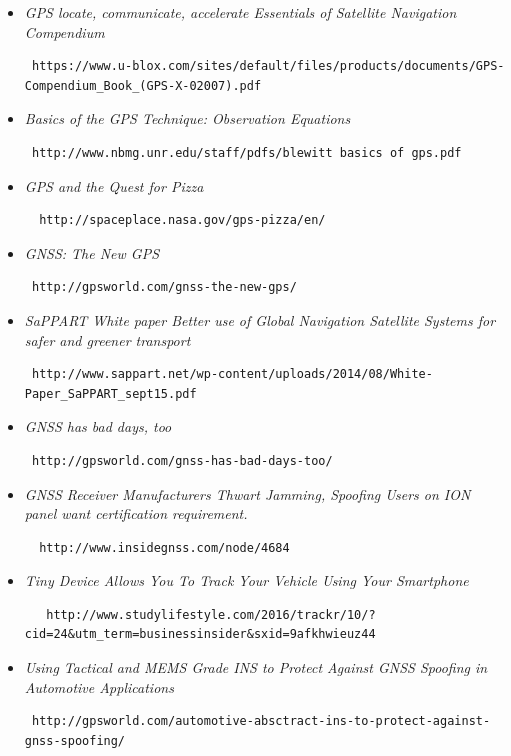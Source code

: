 \begin{itemize}
\item {\textit{GPS locate, communicate, accelerate Essentials of Satellite Navigation Compendium}} {\tiny \begin{verbatim} https://www.u-blox.com/sites/default/files/products/documents/GPS-Compendium_Book_(GPS-X-02007).pdf \end{verbatim}} 
\item {\textit{Basics of the GPS Technique: Observation Equations}} {\tiny \begin{verbatim} http://www.nbmg.unr.edu/staff/pdfs/blewitt basics of gps.pdf\end{verbatim}}  
\item {\textit{GPS and the Quest for Pizza}} {\tiny \begin{verbatim}  http://spaceplace.nasa.gov/gps-pizza/en/\end{verbatim}}
\item {\textit{GNSS: The New GPS}} {\tiny \begin{verbatim} http://gpsworld.com/gnss-the-new-gps/ \end{verbatim}}
\item {\textit{SaPPART White paper Better use of Global Navigation Satellite Systems for safer and greener transport}} {\tiny \begin{verbatim} http://www.sappart.net/wp-content/uploads/2014/08/White-Paper_SaPPART_sept15.pdf \end{verbatim}}
\item {\textit{GNSS has bad days, too}} {\tiny \begin{verbatim} http://gpsworld.com/gnss-has-bad-days-too/ \end{verbatim}}
\item {\textit{GNSS Receiver Manufacturers Thwart Jamming, Spoofing Users on ION panel want certification requirement.}} {\tiny \begin{verbatim}  http://www.insidegnss.com/node/4684 \end{verbatim} }
\item {\textit{Tiny Device Allows You To Track Your Vehicle Using Your Smartphone}} {\tiny \begin{verbatim}   http://www.studylifestyle.com/2016/trackr/10/?cid=24&utm_term=businessinsider&sxid=9afkhwieuz44 \end{verbatim}}
\item {\textit{Using Tactical and MEMS Grade INS to Protect Against GNSS Spoofing in Automotive Applications}} {\tiny \begin{verbatim} http://gpsworld.com/automotive-absctract-ins-to-protect-against-gnss-spoofing/
\end{verbatim}}
\end{itemize}
%
